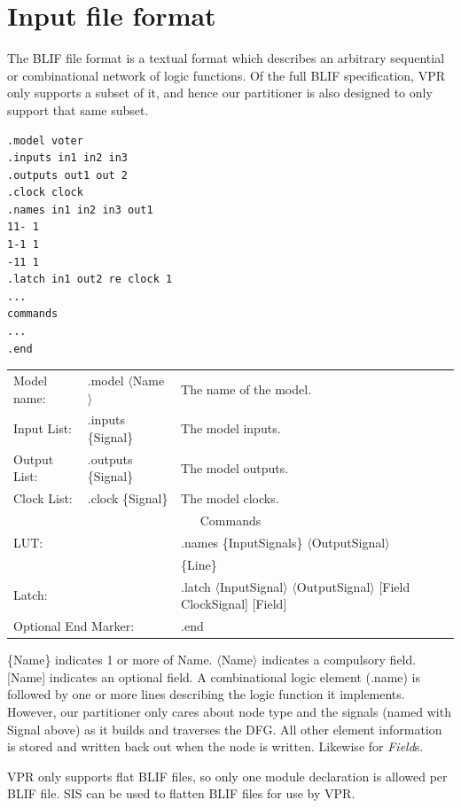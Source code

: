 \documentclass[12pt,final,oneside]{memoir} %
\begin{document}
\section{Input file format}\label{BLIFSection}
The \ac{BLIF} file format is a textual format which describes an arbitrary sequential or combinational network of logic functions\cite{BLIF}.
Of the full \ac{BLIF} specification, \ac{VPR} only supports a subset of it, and hence our partitioner is also designed to only support that same subset.
\begin{lstlisting}[caption=BLIF file layout, label=SampleBlif]
.model voter
.inputs in1 in2 in3
.outputs out1 out 2
.clock clock
.names in1 in2 in3 out1
11- 1
1-1 1
-11 1
.latch in1 out2 re clock 1
...
commands
...
.end
\end{lstlisting}
\begin{tabular}{lll}
    Model name: & .model $\langle$Name$\rangle$ & The name of the model.\\
    Input List: & .inputs \{Signal\} & The model inputs.\\
    Output List:& .outputs \{Signal\} & The model outputs.\\
    Clock List: & .clock \{Signal\} & The model clocks.\\
    \multicolumn{3}{c}{Commands}\\
    \multicolumn{2}{l}{\ac{LUT}:} & .names \{InputSignals\} $\langle$OutputSignal$\rangle$\\
     &&\{Line\}\\
    \multicolumn{2}{l}{Latch:} & .latch $\langle$InputSignal$\rangle$ $\langle$OutputSignal$\rangle$ [Field ClockSignal] [Field]\\
    \multicolumn{2}{l}{Optional End Marker:} & .end
\end{tabular}

\{Name\} indicates 1 or more of Name. $\langle$Name$\rangle$ indicates a compulsory field. [Name] indicates an optional field.
A combinational logic element (.name) is followed by one or more lines describing the logic function it implements. However, our partitioner only cares about node type and the signals (named with Signal above) as it builds and traverses the \ac{DFG}. All other element information is stored and written back out when the node is written. Likewise for \emph{Field}s.

\ac{VPR} only supports flat \ac{BLIF} files, so only one module declaration is allowed per \ac{BLIF} file. \ac{SIS} can be used to flatten \ac{BLIF} files for use by \ac{VPR}.
\end{document}
